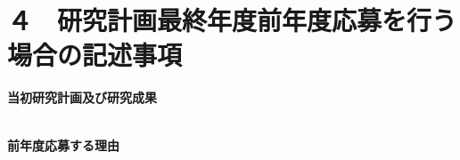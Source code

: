 \documentclass[11pt,a4paper,uplatex,dvipdfmx]{ujarticle} 		%
\newcommand{\研究課題名}{モビリティの時空間調整を活用した電力設備形成構築}
\newcommand{\研究機関名}{名古屋工業大学}
\newcommand{\研究代表者氏名}{中村勇太}
\newcommand{\研究期間の最終元号年度}{10}  %
\begin{document}

\section{４　研究計画最終年度前年度応募を行う場合の記述事項}

\newcommand{\最終年度研究種目名}{}
\newcommand{\最終年度研究課題番号}{}
\newcommand{\最終年度研究課題名}{}
\newcommand{\最終年度研究期間}{令和　年度〜令和\一年目 年度}


\noindent
\textbf{当初研究計画及び研究成果}\\
	　　
\\

\vspace*{10zw}	%

\noindent
\textbf{前年度応募する理由}\\
	　　



\end{document}
